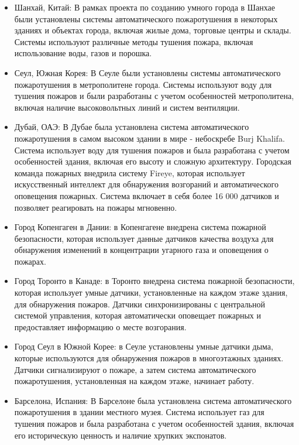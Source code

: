 \begin{multicols}{2}
\begin{itemize}
\item
  Шанхай, Китай: В рамках проекта по созданию умного города в Шанхае
  были установлены системы автоматического пожаротушения в некоторых
  зданиях и объектах города, включая жилые дома, торговые центры и
  склады. Системы используют различные методы тушения пожара, включая
  использование воды, газов и порошка.
\item
  Сеул, Южная Корея: В Сеуле были установлены системы автоматического
  пожаротушения в метрополитене города. Системы используют воду для
  тушения пожаров и были разработаны с учетом особенностей
  метрополитена, включая наличие высоковольтных линий и систем
  вентиляции.
\item
  Дубай, ОАЭ: В Дубае была установлена система автоматического
  пожаротушения в самом высоком здании в мире - небоскребе Burj Khalifa.
  Система использует воду для тушения пожаров и была разработана с
  учетом особенностей здания, включая его высоту и сложную архитектуру.
  Городская команда пожарных внедрила систему Fireye, которая использует
  искусственный интеллект для обнаружения возгораний и автоматического
  оповещения пожарных. Система включает в себя более 16 000 датчиков и
  позволяет реагировать на пожары мгновенно.
\item
  Город Копенгаген в Дании: в Копенгагене внедрена система пожарной
  безопасности, которая использует данные датчиков качества воздуха для
  обнаружения изменений в концентрации угарного газа и оповещения о
  пожарах.
\item
  Город Торонто в Канаде: в Торонто внедрена система пожарной
  безопасности, которая использует умные датчики, установленные на
  каждом этаже здания, для обнаружения пожаров. Датчики синхронизированы
  с центральной системой управления, которая автоматически оповещает
  пожарных и предоставляет информацию о месте возгорания.
\item
  Город Сеул в Южной Корее: в Сеуле установлены умные датчики дыма,
  которые используются для обнаружения пожаров в многоэтажных зданиях.
  Датчики сигнализируют о пожаре, а затем система автоматического
  пожаротушения, установленная на каждом этаже, начинает работу.
\item
  Барселона, Испания: В Барселоне была установлена система
  автоматического пожаротушения в здании местного музея. Система
  использует газ для тушения пожаров и была разработана с учетом
  особенностей здания, включая его историческую ценность и наличие
  хрупких экспонатов.
\end{itemize}


\end{multicols}
